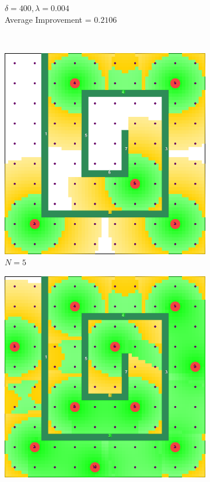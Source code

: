 \documentclass[conference]{IEEEtran}
\begin{document}
\begin{figure}[t]
\begin{subfigure}[t]{0.33\textwidth}
        \caption{$\delta = 400, \lambda = 0.004$ \\ Average Improvement = $0.2106$}
    \end{subfigure}
    \\
    \centering
    \begin{subfigure}[t]{0.10\textwidth}
        \centering
        \includegraphics[width=\textwidth]{Figures/Maze4_1.png}
        \caption{$N=5$}
    \end{subfigure}\hfill
    \begin{subfigure}[t]{0.10\textwidth}
        \centering
        \includegraphics[width=\textwidth]{Figures/Maze4_2.png}

\end{subfigure}
\end{figure}
\end{document}
